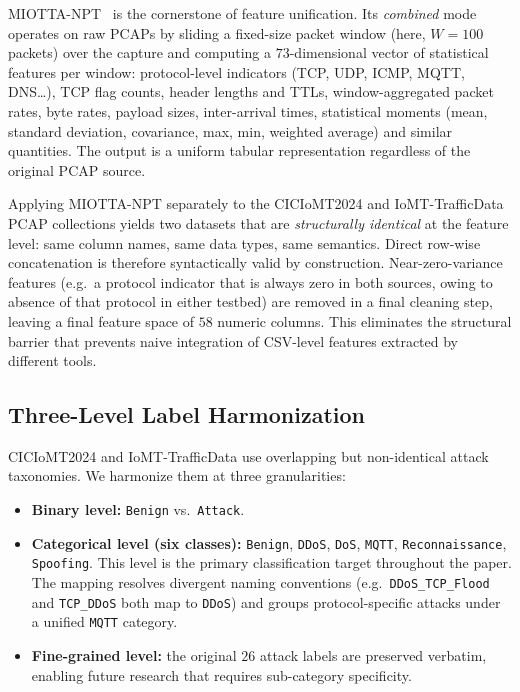 \documentclass[runningheads]{llncs}
\begin{document}
MIOTTA-NPT~\cite{leon2025miotta,miotta_npt_github} is the cornerstone of feature unification. Its \emph{combined} mode operates on raw PCAPs by sliding a fixed-size packet window (here, $W = 100$ packets) over the capture and computing a $73$-dimensional vector of statistical features per window: protocol-level indicators (TCP, UDP, ICMP, MQTT, DNS\dots), TCP flag counts, header lengths and TTLs, window-aggregated packet rates, byte rates, payload sizes, inter-arrival times, statistical moments (mean, standard deviation, covariance, max, min, weighted average) and similar quantities. The output is a uniform tabular representation regardless of the original PCAP source.

Applying MIOTTA-NPT separately to the CICIoMT2024 and IoMT-TrafficData PCAP collections yields two datasets that are \emph{structurally identical} at the feature level: same column names, same data types, same semantics. Direct row-wise concatenation is therefore syntactically valid by construction. Near-zero-variance features (e.g.\ a protocol indicator that is always zero in both sources, owing to absence of that protocol in either testbed) are removed in a final cleaning step, leaving a final feature space of $58$ numeric columns. This eliminates the structural barrier that prevents naive integration of CSV-level features extracted by different tools.

\subsection{Three-Level Label Harmonization}

CICIoMT2024 and IoMT-TrafficData use overlapping but non-identical attack taxonomies. We harmonize them at three granularities:
\begin{itemize}[nosep,leftmargin=*]
  \item \textbf{Binary level:} \texttt{Benign} vs.\ \texttt{Attack}.
  \item \textbf{Categorical level (six classes):} \texttt{Benign}, \texttt{DDoS}, \texttt{DoS}, \texttt{MQTT}, \texttt{Reconnaissance}, \texttt{Spoofing}. This level is the primary classification target throughout the paper. The mapping resolves divergent naming conventions (e.g.\ \texttt{DDoS\_TCP\_Flood} and \texttt{TCP\_DDoS} both map to \texttt{DDoS}) and groups protocol-specific attacks under a unified \texttt{MQTT} category.
  \item \textbf{Fine-grained level:} the original $26$ attack labels are preserved verbatim, enabling future research that requires sub-category specificity.
\end{itemize}
\end{document}
